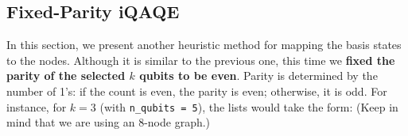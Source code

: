 





\subsection{Fixed-Parity iQAQE}
\label{subsection:Fixed-Parity_iQAQE}


In this section, we present another heuristic method for mapping the basis states to the nodes. Although it is similar to the previous one, this time we \textbf{fixed the parity of the selected $k$ qubits to be even}. Parity is determined by the number of 1's: if the count is even, the parity is even; otherwise, it is odd. For instance, for $k=3$ (with \texttt{n\_qubits = 5}), the lists would take the form: (Keep in mind that we are using an $8$-node graph.)


